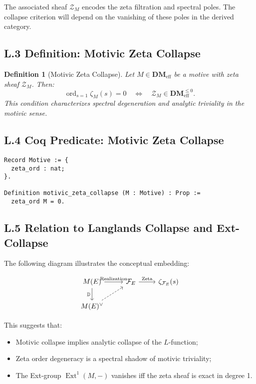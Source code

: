 \documentclass[11pt]{article}
\newtheorem{definition}[theorem]{Definition}
\DeclareMathOperator{\Ext}{Ext}
\newcommand{\ord}{\operatorname{ord}}
\begin{document}
The associated sheaf \( \mathcal{Z}_M \) encodes the zeta filtration and spectral poles. The collapse criterion will depend on the vanishing of these poles in the derived category.

\subsection*{L.3 Definition: Motivic Zeta Collapse}

\begin{definition}[Motivic Zeta Collapse]
Let \( M \in \mathbf{DM}_{\mathrm{eff}} \) be a motive with zeta sheaf \( \mathcal{Z}_M \). Then:
\[
\ord_{s=1} \zeta_M(s) = 0 \quad \Longleftrightarrow \quad \mathcal{Z}_M \in \mathbf{DM}_{\mathrm{eff}}^{\leq 0}.
\]
This condition characterizes spectral degeneration and analytic triviality in the motivic sense.
\end{definition}

\subsection*{L.4 Coq Predicate: Motivic Zeta Collapse}
\begin{lstlisting}[language=Coq]
Record Motive := {
  zeta_ord : nat;
}.

Definition motivic_zeta_collapse (M : Motive) : Prop :=
  zeta_ord M = 0.
\end{lstlisting}

\subsection*{L.5 Relation to Langlands Collapse and Ext-Collapse}

The following diagram illustrates the conceptual embedding:

\[
\begin{tikzcd}
M(E) \arrow[d, "\mathbb{D}"'] \arrow[r, "\text{Realization}"] & \mathcal{F}_E \arrow[r, "\mathrm{Zeta}"] & \zeta_{\mathcal{F}_E}(s) \\
M(E)^\vee \arrow[ru, dashed] & &
\end{tikzcd}
\]

This suggests that:
\begin{itemize}
  \item Motivic collapse implies analytic collapse of the \( L \)-function;
  \item Zeta order degeneracy is a spectral shadow of motivic triviality;
  \item The Ext-group \( \Ext^1(M, -) \) vanishes iff the zeta sheaf is exact in degree 1.
\end{itemize}
\end{document}
